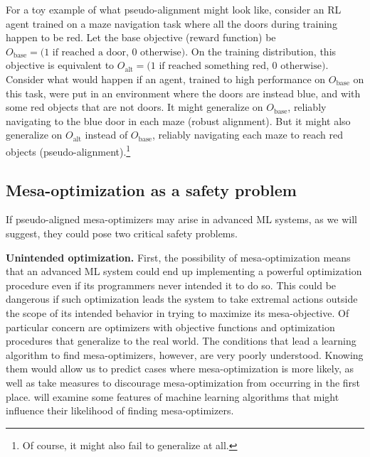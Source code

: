 \documentclass[
  onecolumn,
  natbib,
]{miri-tech-article}
\begin{document}
For a toy example of what pseudo-alignment might look like, consider an RL agent trained on a maze navigation task where all the doors during training happen to be red. Let the base objective (reward function) be $O_\text{base} = \text{(1 if reached a door, 0 otherwise)}$. On the training distribution, this objective is equivalent to $O_\text{alt} = \text{(1 if reached something red, 0 otherwise)}$. Consider what would happen if an agent, trained to high performance on $O_\text{base}$ on this task, were put in an environment where the doors are instead blue, and with some red objects that are not doors. It might generalize on $O_\text{base}$, reliably navigating to the blue door in each maze (robust alignment). But it might also generalize on $O_\text{alt}$ instead of $O_\text{base}$, reliably navigating each maze to reach red objects (pseudo-alignment).\footnote{Of course, it might also fail to generalize at all.}

\subsection{Mesa-optimization as a safety problem}
\label{sec:1.4}

If pseudo-aligned mesa-optimizers may arise in advanced ML systems, as we will suggest, they could pose two critical safety problems.

\textbf{Unintended optimization.} First, the possibility of mesa-optimization means that an advanced ML system could end up implementing a powerful optimization procedure even if its programmers never intended it to do so. This could be dangerous if such optimization leads the system to take extremal actions outside the scope of its intended behavior in trying to maximize its mesa-objective. Of particular concern are optimizers with objective functions and optimization procedures that generalize to the real world. The conditions that lead a learning algorithm to find mesa-optimizers, however, are very poorly understood. Knowing them would allow us to predict cases where mesa-optimization is more likely, as well as take measures to discourage mesa-optimization from occurring in the first place.  will examine some features of machine learning algorithms that might influence their likelihood of finding mesa-optimizers.
\end{document}

